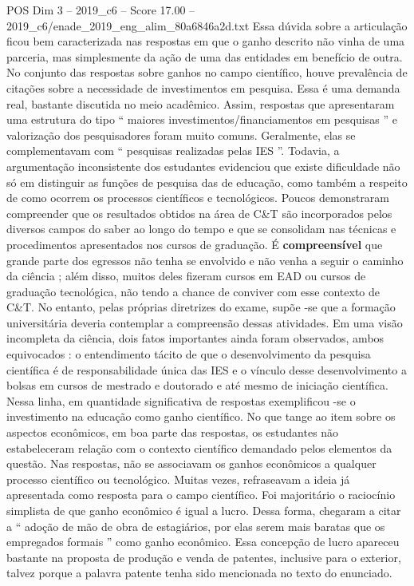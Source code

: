 \begin{textsample}{POS Dim 3 – 2019\_c6 – Score 17.00 – 2019\_c6/enade\_2019\_eng\_alim\_80a6846a2d.txt}
Essa dúvida sobre a articulação ficou bem caracterizada nas respostas em que o ganho descrito não vinha de uma parceria, mas simplesmente da ação de uma das entidades em benefício de outra.
No conjunto das respostas sobre ganhos no campo científico, houve prevalência de citações sobre a necessidade de investimentos em pesquisa.
Essa é uma demanda real, bastante discutida no meio acadêmico.
Assim, respostas que apresentaram uma estrutura do tipo “ maiores investimentos/financiamentos em pesquisas ” e valorização dos pesquisadores foram muito comuns.
Geralmente, elas se complementavam com “ pesquisas realizadas pelas IES ”.
Todavia, a argumentação inconsistente dos estudantes evidenciou que existe dificuldade não só em distinguir as funções de pesquisa das de educação, como também a respeito de como ocorrem os processos científicos e tecnológicos.
Poucos demonstraram compreender que os resultados obtidos na área de C\&T são incorporados pelos diversos campos do saber ao longo do tempo e que se consolidam nas técnicas e procedimentos apresentados nos cursos de graduação.
É \textbf{compreensível} que grande parte dos egressos não tenha se envolvido e não venha a seguir o caminho da ciência ; além disso, muitos deles fizeram cursos em EAD ou cursos de graduação tecnológica, não tendo a chance de conviver com esse contexto de C\&T.
No entanto, pelas próprias diretrizes do exame, supõe -se que a formação universitária deveria contemplar a compreensão dessas atividades.
Em uma visão incompleta da ciência, dois fatos importantes ainda foram observados, ambos equivocados : o entendimento tácito de que o desenvolvimento da pesquisa científica é de responsabilidade única das IES e o vínculo desse desenvolvimento a bolsas em cursos de mestrado e doutorado e até mesmo de iniciação científica.
Nessa linha, em quantidade significativa de respostas exemplificou -se o investimento na educação como ganho científico.
No que tange ao item sobre os aspectos econômicos, em boa parte das respostas, os estudantes não estabeleceram relação com o contexto científico demandado pelos elementos da questão.
Nas respostas, não se associavam os ganhos econômicos a qualquer processo científico ou tecnológico.
Muitas vezes, refraseavam a ideia já apresentada como resposta para o campo científico.
Foi majoritário o raciocínio simplista de que ganho econômico é igual a lucro.
Dessa forma, chegaram a citar a “ adoção de mão de obra de estagiários, por elas serem mais baratas que os empregados formais ” como ganho econômico.
Essa concepção de lucro apareceu bastante na proposta de produção e venda de patentes, inclusive para o exterior, talvez porque a palavra patente tenha sido mencionada no texto do enunciado.

\end{textsample}
